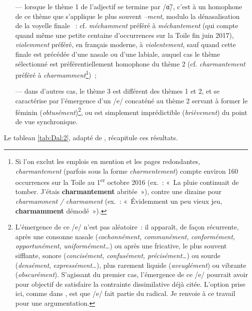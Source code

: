 \documentclass[output=paper]{langsci/langscibook}
\begin{document}
\begin{itemize}
\item[---] lorsque le thème 1 de l'adjectif se termine par /ɑ̃/, c'est à un homophone de ce thème que s'applique le plus souvent \emph{--ment}, modulo la dénasalisation de la voyelle finale %
\citep[cf.][]{Pagliano03}%
%
~: cf. \emph{méchamment} préféré à \emph{méchantement} (qui compte quand même une petite centaine d'occurrences sur la Toile fin juin 2017), \emph{violemment} préféré, en français moderne, à \emph{violentement}, sauf quand cette finale est précédée d'une nasale ou d'une labiale, auquel cas le thème sélectionné est préférentiellement homophone du thème 2 (cf. \emph{charmantement} préféré à \emph{charmamment}\footnote{Si l'on exclut les emplois en mention et les pages redondantes, \emph{charmantement} (parfois sous la forme \emph{charmentement}) compte environ 160 occurrences sur la Toile au 1\textsuperscript{er} octobre 2016 (ex.~: «~La pluie continuait de tomber. J'étais \textbf{charmantement} abritée~»), contre une dizaine pour \emph{charmamment / charmament} (ex.~: «~Évidemment un peu vieux jeu, \textbf{charmamment} démodé~»)\emph{.}})~;

\item[---] dans d'autres cas, le thème 3 est différent des thèmes 1 et 2, et se caractérise par l'émergence d'un /e/ concaténé au thème 2 servant à former le féminin (\emph{obtusé\-ment})\footnote{L'émergence de ce /e/ n'est pas aléatoire~: il apparaît, de façon récurrente, après une consonne nasale (\emph{cochonnément, communément,} \emph{conformément, opportunément,} \emph{uniformément\ldots{}}) ou après une fricative, le plus souvent sifflante, sonore (\emph{concisément, confusément, précisément\ldots{}}) ou sourde (\emph{densément}, \emph{expressément}\ldots{}), plus rarement liquide (\emph{aveuglément}) ou vibrante (\emph{obscurément}). S'agissant du premier cas, l'émergence de ce /e/ pourrait avoir pour objectif de satisfaire la contrainte dissimilative déjà citée. L'option prise ici, comme dans %
\citet{Boye15}%
%
, est que /e/ fait partie du radical. Je renvoie à ce travail pour une argumentation.}, ou est simplement imprédictible (\emph{brièvement}) du point de vue synchronique.
\end{itemize}
Le tableau \ref{tab:Dal:2}, adapté de %
\citet{Boye15}%
%
, récapitule ces résultats.
\medskip
\end{document}
